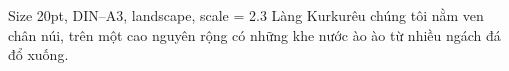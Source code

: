 \documentclass[20pt]{beamer}
\begin{document}
\begin{frame}{Size 20pt, DIN--A3, landscape, scale = 2.3}
\justifying
Làng Kurkurêu chúng tôi nằm ven chân núi, trên một cao nguyên rộng có những khe nước ào ào từ nhiều ngách đá đổ xuống.
\end{frame}
\end{document}
